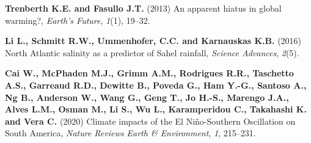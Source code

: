 \documentclass{CUP-JNL-DTM}%
\theoremstyle{definition}
\numberwithin{equation}{section}
\begin{document}
\begin{Backmatter}
\begin{thebibliography}{}
\textbf{Trenberth K.E. and Fasullo J.T.} (2013) An apparent hiatus in global warming?, \textit{Earth's Future}, \textit{1}(1), {19}--{32}.

\textbf{Li L., Schmitt R.W., Ummenhofer, C.C. and Karnauskas K.B.} (2016) North Atlantic salinity as a predictor of Sahel rainfall, \textit{Science Advances}, \textit{2}(5).

\textbf{Cai W., McPhaden M.J., Grimm A.M., Rodrigues R.R., Taschetto A.S., Garreaud R.D., Dewitte B., Poveda G., Ham Y.-G., Santoso A., Ng B., Anderson W., Wang G., Geng T., Jo H.-S., Marengo J.A., Alves L.M., Osman M., Li S., Wu L., Karamperidou C., Takahashi K. and Vera C.} (2020) Climate impacts of the El Ni\~{n}o-Southern Oscillation on South America, \textit{Nature Reviews Earth \& Environment}, \textit{1}, {215}--{231}.

\end{thebibliography}

\end{Backmatter}
\end{document}
